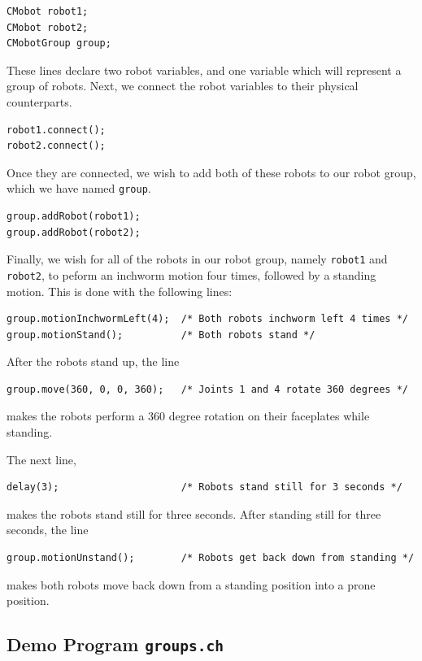 \documentclass{article}
\begin{document}
\begin{verbatim}
CMobot robot1;
CMobot robot2;
CMobotGroup group;
\end{verbatim}

These lines declare two robot variables, and one variable which
will represent a group of robots. Next, we connect the robot
variables to their physical counterparts.

\begin{verbatim}
robot1.connect();
robot2.connect();
\end{verbatim}

Once they are connected, we wish to add both of these robots to our robot group,
which we have named \texttt{group}.

\begin{verbatim}
group.addRobot(robot1);
group.addRobot(robot2);
\end{verbatim}

Finally, we wish for all of the robots in our robot group, namely
\texttt{robot1} and \texttt{robot2}, to peform an inchworm motion four times, followed
by a standing motion. This is done with the following lines:

\begin{verbatim}
group.motionInchwormLeft(4);  /* Both robots inchworm left 4 times */
group.motionStand();          /* Both robots stand */
\end{verbatim}

After the robots stand up, the line
\begin{verbatim}
group.move(360, 0, 0, 360);   /* Joints 1 and 4 rotate 360 degrees */
\end{verbatim}
makes the robots perform a 360 degree rotation on their faceplates
while standing.

The next line, 
\begin{verbatim}
delay(3);                     /* Robots stand still for 3 seconds */
\end{verbatim}
makes the robots stand still for three seconds. After standing
still for three seconds, the line
\begin{verbatim}
group.motionUnstand();        /* Robots get back down from standing */
\end{verbatim}
makes both robots move back down from a standing position into a prone
position.

\subsection{Demo Program \texttt{groups.ch}}
\end{document}
